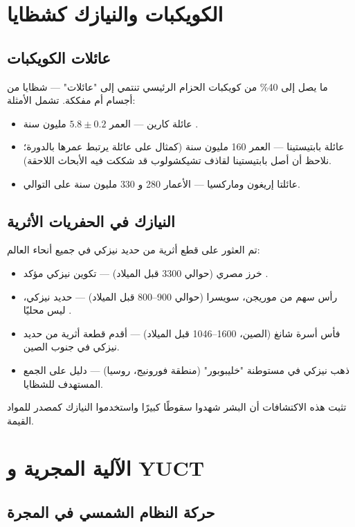 \documentclass[11pt,a4paper]{article}
\begin{document}
	\section{الكويكبات والنيازك كشظايا}
	
	\subsection{عائلات الكويكبات}
	
	ما يصل إلى 40\% من كويكبات الحزام الرئيسي تنتمي إلى "عائلات" — شظايا من أجسام أم مفككة. تشمل الأمثلة:
	\begin{itemize}
		\item عائلة كارين — العمر \(5.8 \pm 0.2\) مليون سنة \cite{Nesvorny2002}.
		\item عائلة بابتيستينا — العمر 160 مليون سنة (كمثال على عائلة يرتبط عمرها بالدورة؛ نلاحظ أن أصل بابتيستينا لقاذف تشيكشولوب قد شككت فيه الأبحاث اللاحقة).
		\item عائلتا إريغون وماركسيا — الأعمار 280 و 330 مليون سنة على التوالي.
	\end{itemize}
	
	\subsection{النيازك في الحفريات الأثرية}
	
	تم العثور على قطع أثرية من حديد نيزكي في جميع أنحاء العالم:
	\begin{itemize}
		\item خرز مصري (حوالي 3300 قبل الميلاد) — تكوين نيزكي مؤكد \cite{Rehren2013}.
		\item رأس سهم من موريجن، سويسرا (حوالي 900–800 قبل الميلاد) — حديد نيزكي، ليس محليًا \cite{Hofmann2023}.
		\item فأس أسرة شانغ (الصين، 1600–1046 قبل الميلاد) — أقدم قطعة أثرية من حديد نيزكي في جنوب الصين.
		\item ذهب نيزكي في مستوطنة "خليبوبور" (منطقة فورونيج، روسيا) — دليل على الجمع المستهدف للشظايا.
	\end{itemize}
	تثبت هذه الاكتشافات أن البشر شهدوا سقوطًا كبيرًا واستخدموا النيازك كمصدر للمواد القيمة.
	
	\section{الآلية المجرية و YUCT}
	
	\subsection{حركة النظام الشمسي في المجرة}
	
\end{document}
